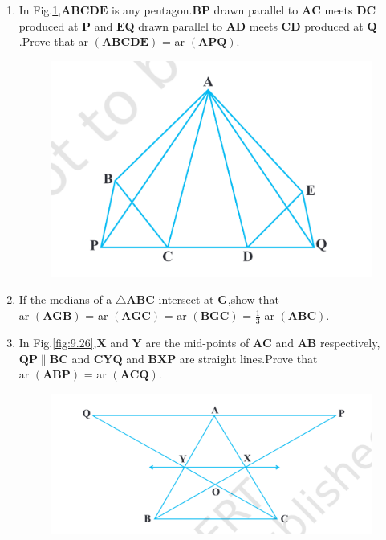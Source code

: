 \documentclass[12pt]{article}
\let\vec\mathbf
\begin{document}
\begin{enumerate}
\newpage
\item In Fig.\ref{fig:9.25},$\vec{ABCDE}$ is any pentagon.$\vec{BP}$ drawn parallel to $\vec{AC}$ meets $\vec{DC}$ produced at $\vec{P}$ and $\vec{EQ}$ drawn parallel to $\vec{AD}$ meets $\vec{CD}$ produced at $\vec{Q}$.Prove that ar $\vec{(ABCDE)}$ = ar $\vec{(APQ)}$.
\begin{figure}[h]
	\centering
	\includegraphics[width=\columnwidth]{Figs/Fig9.25.png}
	\caption{}
	\label{fig:9.25}
\end{figure}
\item If the medians of a $ \triangle\vec{ABC} $ intersect at $\vec{G}$,show that  \\ ar $\vec{(AGB)}$ = ar $\vec{(AGC)}$ = ar $\vec{(BGC)}$ = $\frac{1}{3}$ ar $\vec{(ABC)}  $.
\newpage	
\item In Fig.\ref{fig:9.26},$\vec{X}$ and $\vec{Y}$ are the mid-points of $\vec{AC}$ and $\vec{AB}$ respectively,$\vec{QP} \parallel \vec{BC} $ and $\vec{CYQ}$ and $\vec{BXP}$ are straight lines.Prove that \\ ar $\vec{(ABP)}$ = ar $\vec{(ACQ)}$.
\begin{figure}[h]
	\centering
	\includegraphics[width=\columnwidth]{Figs/Fig9.26.png}

\end{figure}
\end{enumerate}
\end{document}
